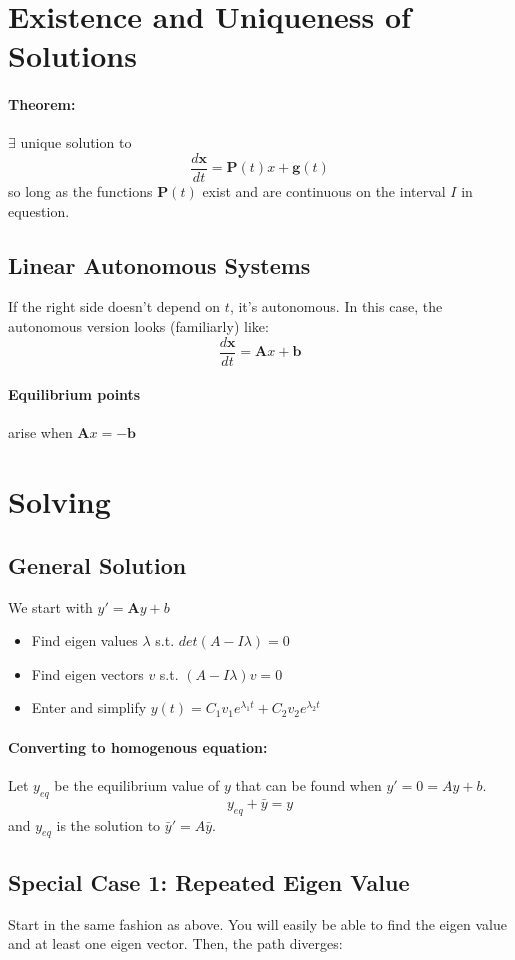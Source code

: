 \documentclass[a4paper,12pt]{report}
\begin{document}
\section{Existence and Uniqueness of Solutions}
\paragraph{Theorem: } $\exists$ unique solution to $$\frac{d\pmb{x}}{dt} = \pmb{P}(t)x + \pmb{g}(t)$$ 
so long as the functions $\pmb{P}(t)$ exist and are continuous on the interval $I$ in equestion.

\subsection{Linear Autonomous Systems}
If the right side doesn't depend on $t$, it's autonomous. In this case, the autonomous 
version looks (familiarly) like: $$\frac{d\pmb{x}}{dt} = \pmb{A}x + \pmb{b}$$

\paragraph{Equilibrium points} arise when $\pmb{A}x = -\pmb{b}$

\section{Solving}
\subsection{General Solution}
We start with $y' = \pmb{A}y+b$
\begin{itemize}
\item Find eigen values $\lambda$ s.t. $det(A-I\lambda) = 0$
\item Find eigen vectors $v$ s.t. $(A-I\lambda)v = 0$
\item Enter and simplify $y(t) = C_1 v_1 e^{\lambda_1 t} + C_2 v_2 e^{\lambda_2 t}$
\end{itemize}
\paragraph{Converting to homogenous equation: } Let $y_{eq}$ be the equilibrium value of $y$ that 
can be found when $y' = 0 = Ay + b$. 
$$y_{eq} + \bar{y} = y$$ and $y_{eq}$ is the solution to $\bar{y}' = A\bar{y}$.


\subsection{Special Case 1: Repeated Eigen Value}
Start in the same fashion as above. You will easily be able to find the eigen value and 
at least one eigen vector. Then, the path diverges:
\end{document}
